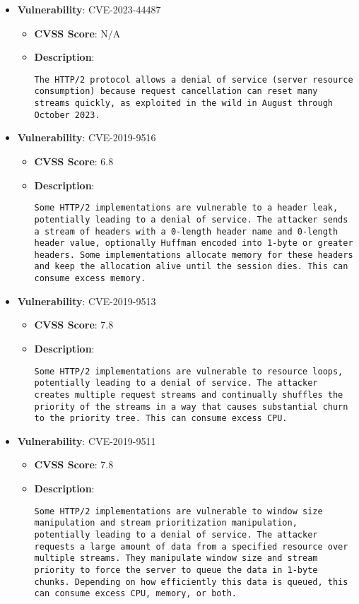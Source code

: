 \documentclass{article}
\begin{document}
\begin{itemize}
        \item \textbf{Vulnerability}: CVE-2023-44487
        \begin{itemize}
            \item \textbf{CVSS Score}:  N/A 
            \item \textbf{Description}:
            \parbox[t]{0.9\linewidth}{
                \verb|The HTTP/2 protocol allows a denial of service (server resource consumption) because request cancellation can reset many streams quickly, as exploited in the wild in August through October 2023.|
            }
        \end{itemize}
    
        \item \textbf{Vulnerability}: CVE-2019-9516
        \begin{itemize}
            \item \textbf{CVSS Score}:  6.8 
            \item \textbf{Description}:
            \parbox[t]{0.9\linewidth}{
                \verb|Some HTTP/2 implementations are vulnerable to a header leak, potentially leading to a denial of service. The attacker sends a stream of headers with a 0-length header name and 0-length header value, optionally Huffman encoded into 1-byte or greater headers. Some implementations allocate memory for these headers and keep the allocation alive until the session dies. This can consume excess memory.|
            }
        \end{itemize}
    
        \item \textbf{Vulnerability}: CVE-2019-9513
        \begin{itemize}
            \item \textbf{CVSS Score}:  7.8 
            \item \textbf{Description}:
            \parbox[t]{0.9\linewidth}{
                \verb|Some HTTP/2 implementations are vulnerable to resource loops, potentially leading to a denial of service. The attacker creates multiple request streams and continually shuffles the priority of the streams in a way that causes substantial churn to the priority tree. This can consume excess CPU.|
            }
        \end{itemize}
    
        \item \textbf{Vulnerability}: CVE-2019-9511
        \begin{itemize}
            \item \textbf{CVSS Score}:  7.8 
            \item \textbf{Description}:
            \parbox[t]{0.9\linewidth}{
                \verb|Some HTTP/2 implementations are vulnerable to window size manipulation and stream prioritization manipulation, potentially leading to a denial of service. The attacker requests a large amount of data from a specified resource over multiple streams. They manipulate window size and stream priority to force the server to queue the data in 1-byte chunks. Depending on how efficiently this data is queued, this can consume excess CPU, memory, or both.|
            }
        \end{itemize}
    

\end{itemize}
\end{document}
